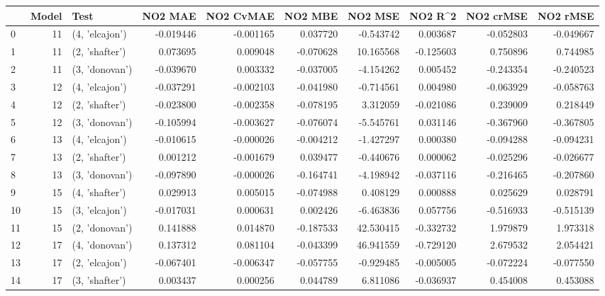 \begin{tabular}{lrlrrrrrrr}
\toprule
{} &  Model &            Test &   NO2 MAE &  NO2 CvMAE &   NO2 MBE &    NO2 MSE &   NO2 R\textasciicircum2 &  NO2 crMSE &  NO2 rMSE \\
\midrule
0  &     11 &  (4, 'elcajon') & -0.019446 &  -0.001165 &  0.037720 &  -0.543742 &  0.003687 &  -0.052803 & -0.049667 \\
1  &     11 &  (2, 'shafter') &  0.073695 &   0.009048 & -0.070628 &  10.165568 & -0.125603 &   0.750896 &  0.744985 \\
2  &     11 &  (3, 'donovan') & -0.039670 &   0.003332 & -0.037005 &  -4.154262 &  0.005452 &  -0.243354 & -0.240523 \\
3  &     12 &  (4, 'elcajon') & -0.037291 &  -0.002103 & -0.041980 &  -0.714561 &  0.004980 &  -0.063929 & -0.058763 \\
4  &     12 &  (2, 'shafter') & -0.023800 &  -0.002358 & -0.078195 &   3.312059 & -0.021086 &   0.239009 &  0.218449 \\
5  &     12 &  (3, 'donovan') & -0.105994 &  -0.003627 & -0.076074 &  -5.545761 &  0.031146 &  -0.367960 & -0.367805 \\
6  &     13 &  (4, 'elcajon') & -0.010615 &  -0.000026 & -0.004212 &  -1.427297 &  0.000380 &  -0.094288 & -0.094231 \\
7  &     13 &  (2, 'shafter') &  0.001212 &  -0.001679 &  0.039477 &  -0.440676 &  0.000062 &  -0.025296 & -0.026677 \\
8  &     13 &  (3, 'donovan') & -0.097890 &  -0.000026 & -0.164741 &  -4.198942 & -0.037116 &  -0.216465 & -0.207860 \\
9  &     15 &  (4, 'shafter') &  0.029913 &   0.005015 & -0.074988 &   0.408129 &  0.000888 &   0.025629 &  0.028791 \\
10 &     15 &  (3, 'elcajon') & -0.017031 &   0.000631 &  0.002426 &  -6.463836 &  0.057756 &  -0.516933 & -0.515139 \\
11 &     15 &  (2, 'donovan') &  0.141888 &   0.014870 & -0.187533 &  42.530415 & -0.332732 &   1.979879 &  1.973318 \\
12 &     17 &  (4, 'donovan') &  0.137312 &   0.081104 & -0.043399 &  46.941559 & -0.729120 &   2.679532 &  2.054421 \\
13 &     17 &  (2, 'elcajon') & -0.067401 &  -0.006347 & -0.057755 &  -0.929485 & -0.005005 &  -0.072224 & -0.077550 \\
14 &     17 &  (3, 'shafter') &  0.003437 &   0.000256 &  0.044789 &   6.811086 & -0.036937 &   0.454008 &  0.453088 \\

\end{tabular}
